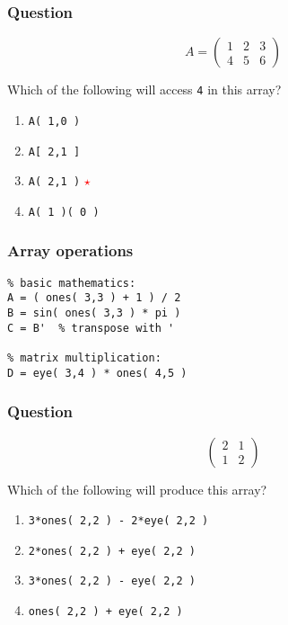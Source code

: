 \documentclass[11pt]{beamer}
\newcommand{\correctstar}{{\Large\textcolor{red}{$\star$}}}
\begin{document}
\begin{frame}[fragile]
  \frametitle{Question}
  \Enlarge
$$
A =
\left(
\begin{array}{ccc}
1 & 2 & 3 \\
4 & 5 & 6
\end{array}
\right)
$$

Which of the following will access \texttt{4} in this array?

  \begin{enumerate}[label=\Alph*]
    \item  \texttt{A( 1,0 )}
    \item  \texttt{A[ 2,1 ]}
    \item  \texttt{A( 2,1 )} \correctstar
    \item  \texttt{A( 1 )( 0 )}
  \end{enumerate}
\end{frame}

\begin{frame}[fragile]
  \frametitle{Array operations}
  \Enlarge

  \begin{Verbatim}
% basic mathematics:
A = ( ones( 3,3 ) + 1 ) / 2
B = sin( ones( 3,3 ) * pi )
C = B'  % transpose with '

% matrix multiplication:
D = eye( 3,4 ) * ones( 4,5 )
  \end{Verbatim}
\end{frame}

\begin{frame}[fragile]
  \frametitle{Question}
  \Enlarge
$$
\left(
\begin{array}{cc}
2 & 1 \\
1 & 2
\end{array}
\right)
$$

Which of the following will produce this array?

  \begin{enumerate}[label=\Alph*]
    \item  \texttt{3*ones( 2,2 ) - 2*eye( 2,2 )}
    \item  \texttt{2*ones( 2,2 ) + eye( 2,2 )}
    \item  \texttt{3*ones( 2,2 ) - eye( 2,2 )}
    \item  \texttt{ones( 2,2 ) + eye( 2,2 )}
  \end{enumerate}
\end{frame}
\end{document}
